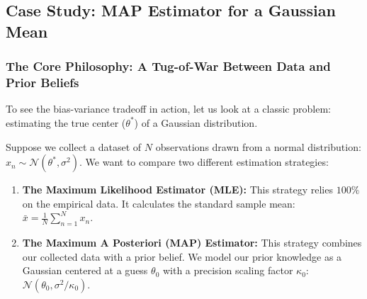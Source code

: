 \documentclass{article}
\begin{document}
\begin{table}[htbp]
\centering
\small
\renewcommand{\arraystretch}{1.4}
\caption{Summary of Core Performance Components in Estimator Analysis}
\label{tab:bias_variance_core_summary}
\end{table}

\subsection{Case Study: MAP Estimator for a Gaussian Mean}

\subsubsection{The Core Philosophy: A Tug-of-War Between Data and Prior Beliefs}
To see the bias-variance tradeoff in action, let us look at a classic problem: estimating the true center ($\theta^*$) of a Gaussian distribution. 

Suppose we collect a dataset of $N$ observations drawn from a normal distribution: $x_n \sim \mathcal{N}(\theta^*, \sigma^2)$. We want to compare two different estimation strategies:
\begin{enumerate}
    \item \textbf{The Maximum Likelihood Estimator (MLE):} This strategy relies $100\%$ on the empirical data. It calculates the standard sample mean: $\bar{x} = \frac{1}{N}\sum_{n=1}^N x_n$.
    \item \textbf{The Maximum A Posteriori (MAP) Estimator:} This strategy combines our collected data with a prior belief. We model our prior knowledge as a Gaussian centered at a guess $\theta_0$ with a precision scaling factor $\kappa_0$: $\mathcal{N}(\theta_0, \sigma^2/\kappa_0)$. 
\end{enumerate}
\end{document}
